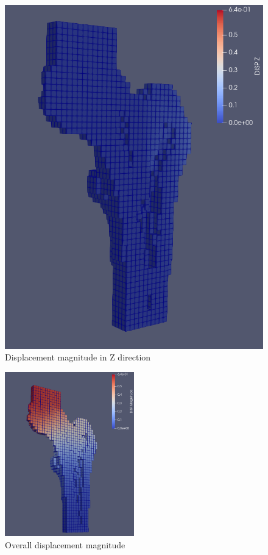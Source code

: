\documentclass[a4paper,12pt]{article}
\begin{document}
\begin{figure}[htbp]
\begin{minipage}[b]{0.3\textwidth}
            \includegraphics[width=\textwidth]{displacement-Z}
            \caption{Displacement magnitude in Z direction}
            \label{fig:displacement-Z}
        \end{minipage}
    \end{figure}

    \begin{figure}[htbp]
        \centering
        \includegraphics[width=0.5\textwidth]{displacement}
        \caption{Overall displacement magnitude}
        \label{fig:displacement}
    \end{figure}
\end{document}
